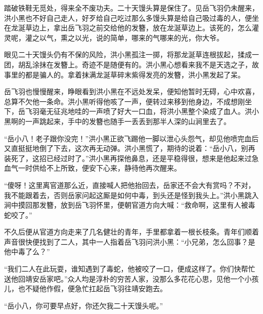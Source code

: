 踏破铁鞋无觅处，得来全不废功夫。二十天馒头算是保住了。见岳飞羽仍未醒来，洪小黑也不好自己走人，好歹给自己吃过那么多馒头算是给自己吸过毒的人，便坐在龙涎草边上，拿出岳飞羽之前交给他的发簪，放在龙涎草边上。该死的，怎么灌灵呢，灌之以气，熏之以光，说的简单，哪来的气哪来的光，你大爷。

眼见二十天馒头仍有不保的风险，洪小黑孤注一掷，将那龙涎草连根拔起，揉成一团，胡乱涂抹在发簪上。奇迹不是随便有的。洪小黑心想看来我不是天选之子，故事里的都是骗人的。拿着抹满龙涎草碎末紫得发亮的发簪，洪小黑发起了呆。

岳飞羽也慢慢醒来，睁眼看到洪小黑在不远处发呆，便知他暂时无碍，心中欢喜，总算不欠他一条命。洪小黑听得他咳了一声，便转过来移到他身边，不成想刚坐下，岳飞羽毫无征兆地哇的一声喷了好大一口血，将洪小黑整个染成了血人。洪小黑啊的一声跳起来，手中的发簪也随手一丢丢到那半人深的山涧里去了。

“岳小八！老子跟你没完！”洪小黑正欲飞踢他一脚以泄心头怨气，却见他喷完血后又直挺挺地倒了下去，这次再无动弹。洪小黑慌了，期待的说着：“岳小八，别再装死了，这招已经过时了。”洪小黑再探他鼻息，还是平稳得很，想来是他起来过急血气一时供给不上所致，便安下心来，静待他再次醒来。

“傻呀！这里离官道那么近，直接喊人把他抬回去，岳家还不会大有赏吗？不对，我不能跟着去，否则岳家问起这厮是如何中毒，到头还是怪到我头上。”洪小黑跳入涧中摸回那发簪，放到岳飞羽怀里，便朝官道方向大喊：“救命啊，这里有人被毒蛇咬了。”

不久后便从官道方向走来了几名健壮的青年，手里都拿着一根长枝条。青年们顺着声音很快便找到了二人，其中一人指着岳飞羽问洪小黑：“小兄弟，怎么回事？是他中毒了么？”

“我们二人在此玩耍，谁知遇到了毒蛇，他被咬了一口，便成这样了。你们快帮忙送他回靖安岳家吧。”众人均是淳朴的穷苦人家，没那么多花花心思，见他一个小孩儿，也不疑他作假，便急忙扛起岳飞羽往靖安跑去。

“岳小八，你可要早点好，你还欠我二十天馒头呢。”